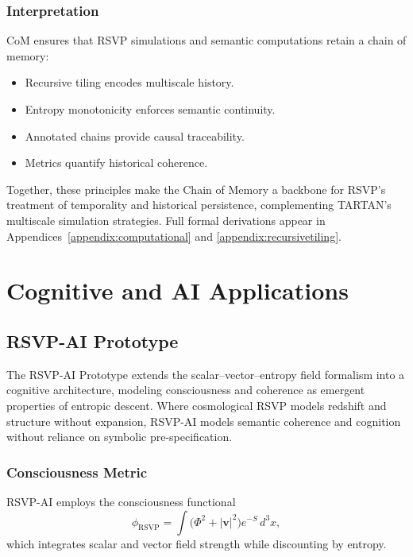 \documentclass[12pt]{report}
\begin{document}
\section{Interpretation}

CoM ensures that RSVP simulations and semantic computations retain a chain of memory:
\begin{itemize}
    \item Recursive tiling encodes multiscale history.  
    \item Entropy monotonicity enforces semantic continuity.  
    \item Annotated chains provide causal traceability.  
    \item Metrics quantify historical coherence.  
\end{itemize}

Together, these principles make the Chain of Memory a backbone for RSVP’s treatment of temporality and historical persistence, complementing TARTAN’s multiscale simulation strategies. Full formal derivations appear in Appendices~\ref{appendix:computational} and \ref{appendix:recursivetiling}.

\part{Cognitive and AI Applications}

\chapter{RSVP-AI Prototype}

The RSVP-AI Prototype extends the scalar--vector--entropy field formalism into a cognitive architecture, modeling consciousness and coherence as emergent properties of entropic descent.  
Where cosmological RSVP models redshift and structure without expansion, RSVP-AI models semantic coherence and cognition without reliance on symbolic pre-specification.

\section{Consciousness Metric}

RSVP-AI employs the consciousness functional
\begin{equation}
\phi_{\text{RSVP}} = \int \big(\Phi^2 + |\mathbf{v}|^2 \big) e^{-S} \, d^3x,
\label{eq:phirsvp}
\end{equation}
which integrates scalar and vector field strength while discounting by entropy.  
\end{document}

